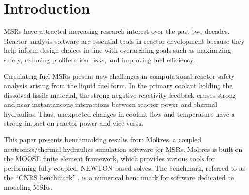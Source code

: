 \section{Introduction}

\glspl{MSR} have attracted increasing research interest over the past two
decades. Reactor analysis software are essential tools in reactor development
because they help inform design choices in line with overarching goals such as
maximizing safety, reducing proliferation risks, and improving fuel
efficiency.

Circulating fuel \glspl{MSR} present new challenges in computational reactor
safety analysis arising from the liquid fuel form. In the primary coolant
holding the dissolved fissile material, the strong negative reactivity feedback
causes strong and near-instantaneous interactions between reactor power and
thermal-hydraulics. Thus, unexpected changes in coolant flow and temperature
have a strong impact on reactor power and vice versa.

This paper presents benchmarking results from Moltres, a coupled
neutronics/thermal-hydraulics simulation software for \glspl{MSR}. Moltres is
built on the \gls{MOOSE} \cite{gaston_physics-based_2015} finite element
framework, which provides various tools for performing fully-coupled,
NEWTON-based solves. The benchmark, referred to as the ``CNRS benchmark''
\cite{tiberga_results_2020}, is a numerical benchmark for software dedicated to
modeling \glspl{MSR}.
